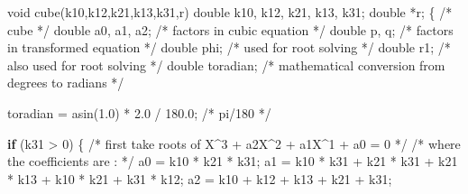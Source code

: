 \documentclass[
  letterpaper,
  DIV=11,
  numbers=noendperiod]{scrartcl}
\newenvironment{Shaded}{\begin{snugshade}}{\end{snugshade}}
\newcommand{\CommentTok}[1]{\textcolor[rgb]{0.37,0.37,0.37}{#1}}
\newcommand{\ControlFlowTok}[1]{\textcolor[rgb]{0.00,0.23,0.31}{\textbf{#1}}}
\newcommand{\DataTypeTok}[1]{\textcolor[rgb]{0.68,0.00,0.00}{#1}}
\newcommand{\DecValTok}[1]{\textcolor[rgb]{0.68,0.00,0.00}{#1}}
\newcommand{\FloatTok}[1]{\textcolor[rgb]{0.68,0.00,0.00}{#1}}
\newcommand{\NormalTok}[1]{\textcolor[rgb]{0.00,0.23,0.31}{#1}}
\newcommand{\OperatorTok}[1]{\textcolor[rgb]{0.37,0.37,0.37}{#1}}
\begin{document}
\begin{Shaded}
\begin{Highlighting}[]
\DataTypeTok{void}\NormalTok{ cube}\OperatorTok{(}\NormalTok{k10}\OperatorTok{,}\NormalTok{k12}\OperatorTok{,}\NormalTok{k21}\OperatorTok{,}\NormalTok{k13}\OperatorTok{,}\NormalTok{k31}\OperatorTok{,}\NormalTok{r}\OperatorTok{)}
\DataTypeTok{double}\NormalTok{ k10}\OperatorTok{,}\NormalTok{ k12}\OperatorTok{,}\NormalTok{ k21}\OperatorTok{,}\NormalTok{ k13}\OperatorTok{,}\NormalTok{ k31}\OperatorTok{;}
\DataTypeTok{double} \OperatorTok{*}\NormalTok{r}\OperatorTok{;}
    \OperatorTok{\{}                   \CommentTok{/* cube */}
    \DataTypeTok{double}\NormalTok{ a0}\OperatorTok{,}\NormalTok{ a1}\OperatorTok{,}\NormalTok{ a2}\OperatorTok{;}  \CommentTok{/* factors in cubic equation */}
    \DataTypeTok{double}\NormalTok{ p}\OperatorTok{,}\NormalTok{ q}\OperatorTok{;}        \CommentTok{/* factors in transformed equation */}
    \DataTypeTok{double}\NormalTok{ phi}\OperatorTok{;}         \CommentTok{/* used for root solving */}
    \DataTypeTok{double}\NormalTok{ r1}\OperatorTok{;}          \CommentTok{/* also used for root solving */}
    \DataTypeTok{double}\NormalTok{ toradian}\OperatorTok{;}    \CommentTok{/* mathematical conversion from degrees to radians */}

\NormalTok{    toradian }\OperatorTok{=}\NormalTok{ asin}\OperatorTok{(}\FloatTok{1.0}\OperatorTok{)} \OperatorTok{*} \FloatTok{2.0} \OperatorTok{/} \FloatTok{180.0}\OperatorTok{;} \CommentTok{/* pi/180 */}

    \ControlFlowTok{if} \OperatorTok{(}\NormalTok{k31 }\OperatorTok{\textgreater{}} \DecValTok{0}\OperatorTok{)}
        \OperatorTok{\{}
        \CommentTok{/* first take roots of X\^{}3 + a2X\^{}2 + a1X\^{}1 + a0 = 0 */}
        \CommentTok{/* where the coefficients are : */}
\NormalTok{        a0 }\OperatorTok{=}\NormalTok{ k10 }\OperatorTok{*}\NormalTok{ k21 }\OperatorTok{*}\NormalTok{ k31}\OperatorTok{;}
\NormalTok{        a1 }\OperatorTok{=}\NormalTok{ k10 }\OperatorTok{*}\NormalTok{ k31 }\OperatorTok{+}\NormalTok{ k21 }\OperatorTok{*}\NormalTok{ k31 }\OperatorTok{+}\NormalTok{ k21 }\OperatorTok{*}\NormalTok{ k13 }\OperatorTok{+}\NormalTok{ k10 }\OperatorTok{*}\NormalTok{ k21 }\OperatorTok{+}\NormalTok{ k31 }\OperatorTok{*}\NormalTok{ k12}\OperatorTok{;}
\NormalTok{        a2 }\OperatorTok{=}\NormalTok{ k10 }\OperatorTok{+}\NormalTok{ k12 }\OperatorTok{+}\NormalTok{ k13 }\OperatorTok{+}\NormalTok{ k21 }\OperatorTok{+}\NormalTok{ k31}\OperatorTok{;}


\end{Highlighting}
\end{Shaded}
\end{document}
